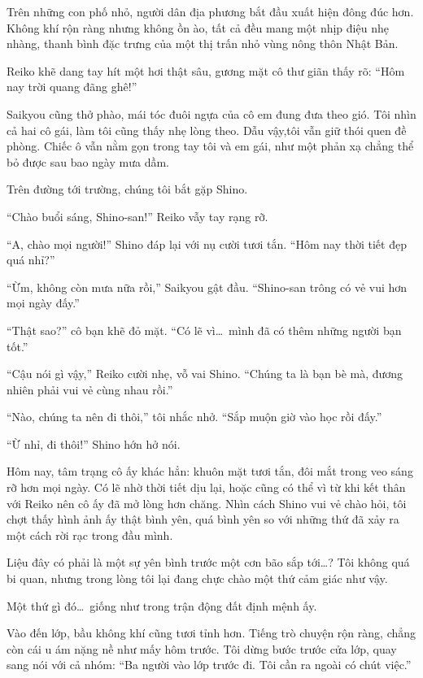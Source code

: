 \documentclass[../main.tex]{subfiles}
\begin{document}
Trên những con phố nhỏ, người dân địa phương bắt đầu xuất hiện đông đúc hơn. Không khí rộn ràng nhưng không ồn ào, tất cả đều mang một nhịp điệu nhẹ nhàng, thanh bình đặc trưng của một thị trấn nhỏ vùng nông thôn Nhật Bản.

Reiko khẽ dang tay hít một hơi thật sâu, gương mặt cô thư giãn thấy rõ: ``Hôm nay trời quang đãng ghê!''

Saikyou cũng thở phào, mái tóc đuôi ngựa của cô em đung đưa theo gió. Tôi nhìn cả hai cô gái, làm tôi cũng thấy nhẹ lòng theo. Dẫu vậy,tôi vẫn giữ thói quen đề phòng. Chiếc ô vẫn nằm gọn trong tay tôi và em gái, như một phản xạ chẳng thể bỏ được sau bao ngày mưa dầm.

Trên đường tới trường, chúng tôi bắt gặp Shino.

``Chào buổi sáng, Shino-san!'' Reiko vẫy tay rạng rỡ.

``A, chào mọi người!'' Shino đáp lại với nụ cười tươi tắn. ``Hôm nay thời tiết đẹp quá nhỉ?''

``Ừm, không còn mưa nữa rồi,'' Saikyou gật đầu. ``Shino-san trông có vẻ vui hơn mọi ngày đấy.''

``Thật sao?'' cô bạn khẽ đỏ mặt. ``Có lẽ vì\dots\ mình đã có thêm những người bạn tốt.''

``Cậu nói gì vậy,'' Reiko cười nhẹ, vỗ vai Shino. ``Chúng ta là bạn bè mà, đương nhiên phải vui vẻ cùng nhau rồi.''

``Nào, chúng ta nên đi thôi,'' tôi nhắc nhở. ``Sắp muộn giờ vào học rồi đấy.''

``Ừ nhỉ, đi thôi!'' Shino hớn hở nói.

Hôm nay, tâm trạng cô ấy khác hẳn: khuôn mặt tươi tắn, đôi mắt trong veo sáng rỡ hơn mọi ngày. Có lẽ nhờ thời tiết dịu lại, hoặc cũng có thể vì từ khi kết thân với Reiko nên cô ấy đã mở lòng hơn chăng. Nhìn cách Shino vui vẻ chào hỏi, tôi chợt thấy hình ảnh ấy thật bình yên, quá bình yên so với những thứ đã xảy ra một cách rời rạc trong đầu mình.

Liệu đây có phải là một sự yên bình trước một cơn bão sắp tới\dots? Tôi không quá bi quan, nhưng trong lòng tôi lại đang chực chào một thứ cảm giác như vậy.

Một thứ gì đó\dots\ giống như trong trận động đất định mệnh ấy.

\ct

Vào đến lớp, bầu không khí cũng tươi tỉnh hơn. Tiếng trò chuyện rộn ràng, chẳng còn cái u ám nặng nề như mấy hôm trước. Tôi dừng bước trước cửa lớp, quay sang nói với cả nhóm: ``Ba người vào lớp trước đi. Tôi cần ra ngoài có chút việc.''
\end{document}
